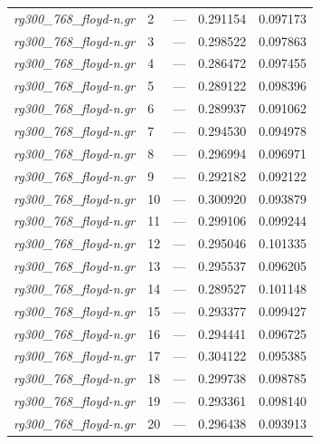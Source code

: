 \documentclass[12pt]{article}
\begin{document}
\begin{longtable}{l|l|lll}
\textit{rg300\_768\_floyd-n.gr}  &  2        & ---                    & 0.291154             & 0.097173                   \\
\textit{rg300\_768\_floyd-n.gr}  &  3        & ---                    & 0.298522             & 0.097863                   \\
\textit{rg300\_768\_floyd-n.gr}  &  4        & ---                    & 0.286472             & 0.097455                   \\
\textit{rg300\_768\_floyd-n.gr}  &  5        & ---                    & 0.289122             & 0.098396                   \\
\textit{rg300\_768\_floyd-n.gr}  &  6        & ---                    & 0.289937             & 0.091062                   \\
\textit{rg300\_768\_floyd-n.gr}  &  7        & ---                    & 0.294530             & 0.094978                   \\
\textit{rg300\_768\_floyd-n.gr}  &  8        & ---                    & 0.296994             & 0.096971                   \\
\textit{rg300\_768\_floyd-n.gr}  &  9        & ---                    & 0.292182             & 0.092122                   \\
\textit{rg300\_768\_floyd-n.gr}  &  10       & ---                    & 0.300920             & 0.093879                   \\
\textit{rg300\_768\_floyd-n.gr}  &  11       & ---                    & 0.299106             & 0.099244                   \\
\textit{rg300\_768\_floyd-n.gr}  &  12       & ---                    & 0.295046             & 0.101335                   \\
\textit{rg300\_768\_floyd-n.gr}  &  13       & ---                    & 0.295537             & 0.096205                   \\
\textit{rg300\_768\_floyd-n.gr}  &  14       & ---                    & 0.289527             & 0.101148                   \\
\textit{rg300\_768\_floyd-n.gr}  &  15       & ---                    & 0.293377             & 0.099427                   \\
\textit{rg300\_768\_floyd-n.gr}  &  16       & ---                    & 0.294441             & 0.096725                   \\
\textit{rg300\_768\_floyd-n.gr}  &  17       & ---                    & 0.304122             & 0.095385                   \\
\textit{rg300\_768\_floyd-n.gr}  &  18       & ---                    & 0.299738             & 0.098785                   \\
\textit{rg300\_768\_floyd-n.gr}  &  19       & ---                    & 0.293361             & 0.098140                   \\
\textit{rg300\_768\_floyd-n.gr}  &  20       & ---                    & 0.296438             & 0.093913                   \\ \hline
\end{longtable}



\end{document}
